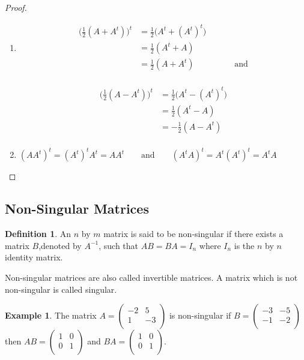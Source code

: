 \documentclass[11pt,a4paper]{article}
\theoremstyle{definition}
\newtheorem{defn}[thm]{Definition}
\newtheorem{exa}[thm]{Example}
\begin{document}
\begin{proof}
\begin{enumerate}
\item
\begin{flushleft}
\begin{align*}
\Big(\frac{1}{2}(A+A^t)\Big)^t &=\frac{1}{2}\Big(A^t+(A^t)^t\Big)\\
&=\frac{1}{2}(A^t+A)\\
&=\frac{1}{2}(A+A^t)\hspace{2cm}\text{and}\\
\end{align*}
\end{flushleft}


\begin{flushright}
\begin{align*}
\Big(\frac{1}{2}(A-A^t)\Big)^t &=\frac{1}{2}\Big(A^t-(A^t)^t\Big)\\
&=\frac{1}{2}(A^t-A)\\
&=-\frac{1}{2}(A-A^t)\\
\end{align*}
\end{flushright}

\item
$(AA^t)^t =(A^t)^tA^t =AA^t\qquad\text{and}\qquad  (A^tA)^t = A^t(A^t)^t=A^tA$
\end{enumerate}
\end{proof}


\subsection{Non-Singular Matrices}

\begin{defn}
An $n$ by $m$ matrix is said to be non-singular if there exists a matrix $B$,denoted by $A^{-1}$, such that $AB=BA=I_n$ where $I_n$ is the $n$ by $n$ identity matrix.

Non-singular matrices are also called invertible matrices. A matrix which is not non-singular is called singular.
\end{defn}


\begin{exa}
The matrix $A=
\begin{pmatrix}
-2&5\\1&-3\\
\end{pmatrix}
$ is non-singular if $B=
\begin{pmatrix}
-3&-5\\-1&-2\\
\end{pmatrix}
$ then $AB=
\begin{pmatrix}
1&0\\0&1\\
\end{pmatrix}
$ and $BA=
\begin{pmatrix}
1&0\\0&1\\
\end{pmatrix}
$.
\end{exa}
\end{document}
